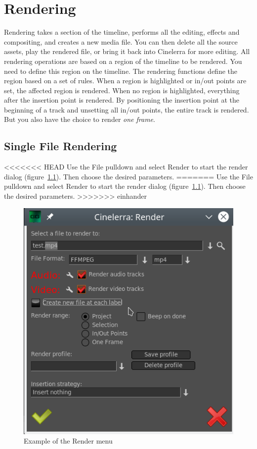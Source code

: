 \chapter{Rendering}%
\label{cha:rendering}

Rendering takes a section of the timeline, performs all the editing, effects and compositing, and creates a new media file.  You can then delete all the source assets, play the rendered file, or bring it back into Cinelerra for more editing.   All rendering operations are based on a region of the timeline to be rendered.  You need to define this region on the timeline.  The rendering functions define the region based on a set of rules.  When a region is highlighted or in/out points are set, the affected region is rendered.  When no region is highlighted, everything after the insertion point is rendered.  By
positioning the insertion point at the beginning of a track and unsetting all in/out points, the entire track is rendered.  But you also have the choice to render \textit{one frame}.

\section{Single File Rendering}%
\label{sec:single_file_rendering}

<<<<<<< HEAD
\noindent Use the File pulldown and select Render to start the render dialog (figure~\ref{fig:render}).  Then choose the desired parameters.
=======
Use the File pulldown and select Render to start the render dialog (figure~\ref{fig:render}).  Then choose the desired parameters.
>>>>>>> einhander

\begin{figure}[htpb]
    \centering
    \includegraphics[width=0.7\linewidth]{images/render.png}
    \caption{Example of the Render menu}
    \label{fig:render}
\end{figure}

